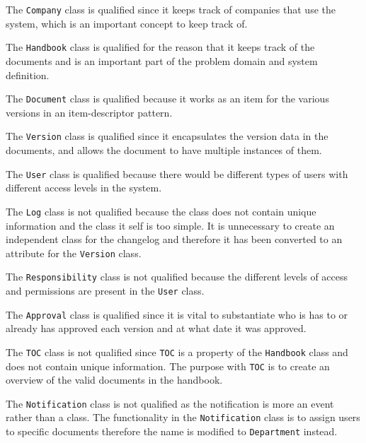 

The \texttt{Company} class is qualified since it keeps track of companies that use the system, which is an important concept to keep track of.

The \texttt{Handbook} class is qualified for the reason that it keeps track of the documents and is an important part of the problem domain and system definition.

The \texttt{Document} class is qualified because it works as an item for the various versions in an item-descriptor pattern.

The \texttt{Version} class is qualified since it encapsulates the version data in the documents, and allows the document to have multiple instances of them.

The \texttt{User} class is qualified because there would be different types of users with different access levels in the system.

The \texttt{Log} class is not qualified because the class does not contain unique information and the class it self is too simple.
It is unnecessary to create an independent class for the changelog and therefore it has been converted to an attribute for the \texttt{Version} class.

The \texttt{Responsibility} class is not qualified because the different levels of access and permissions are present in the \texttt{User} class.

The \texttt{Approval} class is qualified since it is vital to substantiate who is has to or already has approved each version and at what date it was approved.

The \texttt{TOC} class is not qualified since \texttt{TOC} is a property of the \texttt{Handbook} class and does not contain unique information.
The purpose with \texttt{TOC} is to create an overview of the valid documents in the handbook.

The \texttt{Notification} class is not qualified as the notification is more an event rather than a class.
The functionality in the \texttt{Notification} class is to assign users to specific documents therefore the name is modified to \texttt{Department} instead.

